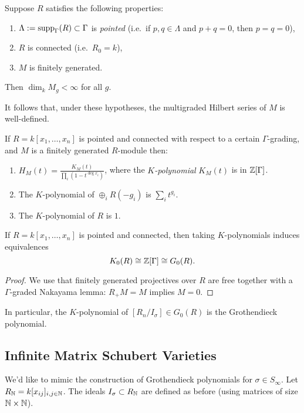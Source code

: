\documentclass{amsart}
\begin{document}
\begin{prop}
	Suppose $R$ satisfies the following properties:
	\begin{enumerate}
		\item $\Lambda := \operatorname{supp}_\Gamma(R) \subset \Gamma$ is \emph{pointed} (i.e.\ if $p, q \in \Lambda$ and $p + q = 0$, then $p = q = 0$),
		\item $R$ is connected (i.e.\ $R_0 = k$),
		\item $M$ is finitely generated.
	\end{enumerate}
	Then $\dim_k M_g < \infty$ for all $g$.
\end{prop}

It follows that, under these hypotheses, the multigraded Hilbert series of $M$ is well-defined.

\begin{prop}
	If $R = k[x_1, \dots, x_n]$ is pointed and connected with respect to a certain $\Gamma$-grading, and $M$ is a finitely generated $R$-module then:
	\begin{enumerate}
		\item $H_M(t) = \frac{K_M(t)}{\prod_i (1 - t^{\deg x_i})}$, where the \emph{$K$-polynomial} $K_M(t)$ is in $\mathbb{Z}[\Gamma]$.
		\item The $K$-polynomial of $\oplus_i R(-g_i)$ is $\sum_i t^{g_i}$.
		\item The $K$-polynomial of $R$ is $1$.
	\end{enumerate}
\end{prop}

\begin{thm}
	If $R = k[x_1, \dots, x_n]$ is pointed and connected, then taking $K$-polynomials induces equivalences
	\[
		K_0(R) \cong \mathbb{Z}[\Gamma] \cong G_0(R).
	\]
\end{thm}

\begin{proof}
	We use that finitely generated projectives over $R$ are free together with a $\Gamma$-graded Nakayama lemma: $R_+ M = M$ implies $M = 0$.
\end{proof}

In particular, the $K$-polynomial of $[R_n / I_\sigma] \in G_0(R)$ is the Grothendieck polynomial.

\subsection{Infinite Matrix Schubert Varieties}

We'd like to mimic the construction of Grothendieck polynomials for $\sigma \in S_\infty$.
Let $R_{\mathbb{N}} = k[x_{ij}]_{i,j \in \mathbb{N}}$.
The ideals $I_\sigma \subset R_{\mathbb{N}}$ are defined as before (using matrices of size $\mathbb{N} \times \mathbb{N}$).
\end{document}
